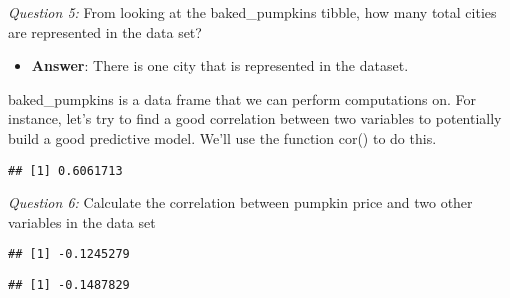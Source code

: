 \documentclass[
]{article}
\newenvironment{Shaded}{\begin{snugshade}}{\end{snugshade}}
\newcommand{\CommentTok}[1]{\textcolor[rgb]{0.56,0.35,0.01}{\textit{#1}}}
\newcommand{\FunctionTok}[1]{\textcolor[rgb]{0.00,0.00,0.00}{#1}}
\newcommand{\NormalTok}[1]{#1}
\newcommand{\SpecialCharTok}[1]{\textcolor[rgb]{0.00,0.00,0.00}{#1}}
\providecommand{\tightlist}{%
  \setlength{\itemsep}{0pt}\setlength{\parskip}{0pt}}
\begin{document}
\emph{Question 5:} From looking at the baked\_pumpkins tibble, how many
total cities are represented in the data set?

\begin{itemize}
\tightlist
\item
  \textbf{Answer}: There is one city that is represented in the dataset.
\end{itemize}

baked\_pumpkins is a data frame that we can perform computations on. For
instance, let's try to find a good correlation between two variables to
potentially build a good predictive model. We'll use the function cor()
to do this.

\begin{Shaded}
\end{Shaded}

\begin{verbatim}
## [1] 0.6061713
\end{verbatim}

\emph{Question 6:} Calculate the correlation between pumpkin price and
two other variables in the data set

\begin{Shaded}
\end{Shaded}

\begin{verbatim}
## [1] -0.1245279
\end{verbatim}

\begin{Shaded}
\end{Shaded}

\begin{verbatim}
## [1] -0.1487829
\end{verbatim}
\end{document}
